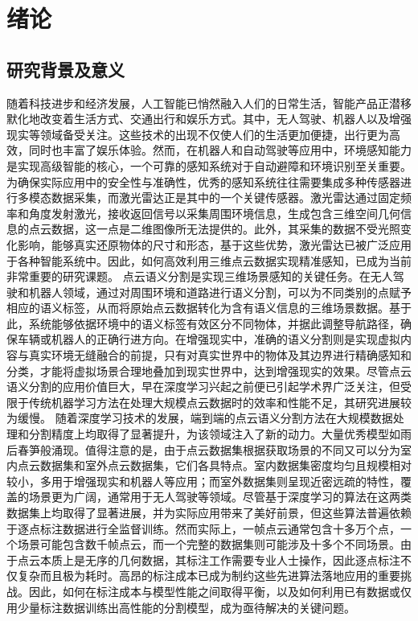 \chapter{绪论}
\thispagestyle{others}
\pagestyle{others}
\xiaosi

\section{研究背景及意义}
    随着科技进步和经济发展，人工智能已悄然融入人们的日常生活，智能产品正潜移默化地改变着生活方式、交通出行和娱乐方式。其中，无人驾驶、机器人以及增强现实等领域备受关注。这些技术的出现不仅使人们的生活更加便捷，出行更为高效，同时也丰富了娱乐体验。然而，在机器人和自动驾驶等应用中，环境感知能力是实现高级智能的核心，一个可靠的感知系统对于自动避障和环境识别至关重要。为确保实际应用中的安全性与准确性，优秀的感知系统往往需要集成多种传感器进行多模态数据采集，而激光雷达正是其中的一个关键传感器。激光雷达通过固定频率和角度发射激光，接收返回信号以采集周围环境信息，生成包含三维空间几何信息的点云数据，这一点是二维图像所无法提供的。此外，其采集的数据不受光照变化影响，能够真实还原物体的尺寸和形态，基于这些优势，激光雷达已被广泛应用于各种智能系统中。因此，如何高效利用三维点云数据实现精准感知，已成为当前非常重要的研究课题。
    点云语义分割是实现三维场景感知的关键任务。在无人驾驶和机器人领域，通过对周围环境和道路进行语义分割，可以为不同类别的点赋予相应的语义标签，从而将原始点云数据转化为含有语义信息的三维场景数据。基于此，系统能够依据环境中的语义标签有效区分不同物体，并据此调整导航路径，确保车辆或机器人的正确行进方向。在增强现实中，准确的语义分割则是实现虚拟内容与真实环境无缝融合的前提，只有对真实世界中的物体及其边界进行精确感知和分类，才能将虚拟场景合理地叠加到现实世界中，达到增强现实的效果。尽管点云语义分割的应用价值巨大，早在深度学习兴起之前便已引起学术界广泛关注，但受限于传统机器学习方法在处理大规模点云数据时的效率和性能不足，其研究进展较为缓慢。
    随着深度学习技术的发展，端到端的点云语义分割方法在大规模数据处理和分割精度上均取得了显著提升，为该领域注入了新的动力。大量优秀模型如雨后春笋般涌现。值得注意的是，由于点云数据集根据获取场景的不同又可以分为室内点云数据集和室外点云数据集，它们各具特点。室内数据集密度均匀且规模相对较小，多用于增强现实和机器人等应用；而室外数据集则呈现近密远疏的特性，覆盖的场景更为广阔，通常用于无人驾驶等领域。尽管基于深度学习的算法在这两类数据集上均取得了显著进展，并为实际应用带来了美好前景，但这些算法普遍依赖于逐点标注数据进行全监督训练。然而实际上，一帧点云通常包含十多万个点，一个场景可能包含数千帧点云，而一个完整的数据集则可能涉及十多个不同场景。由于点云本质上是无序的几何数据，其标注工作需要专业人士操作，因此逐点标注不仅复杂而且极为耗时。高昂的标注成本已成为制约这些先进算法落地应用的重要挑战。因此，如何在标注成本与模型性能之间取得平衡，以及如何利用已有数据或仅用少量标注数据训练出高性能的分割模型，成为亟待解决的关键问题。
